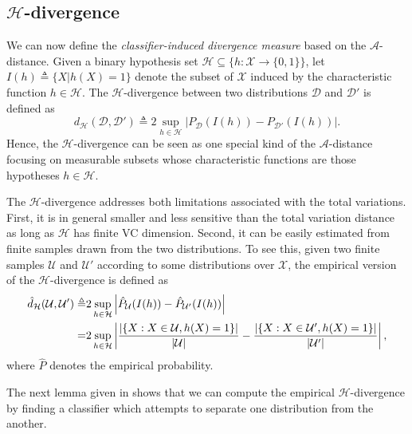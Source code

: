 \subsection{$\mathcal{H}$-divergence}
We can now define the \textit{classifier-induced divergence measure} based on the $\mathcal{A}$-distance. Given a binary hypothesis set $\mathcal{H} \subseteq \{h:\mathcal{X} \rightarrow \{0,1\}\}$, let $I(h) \triangleq \{ X \vert h(X)=1 \}$ denote the subset of $\mathcal{X}$ induced by the characteristic function $h \in \mathcal{H}$. The $\mathcal{H}$-divergence between two distributions $\mathcal{D}$ and $\mathcal{D}'$ is defined as
\begin{equation}\label{eq:h_divergence}
  d_{\mathcal{H}}(\mathcal{D}, \mathcal{D}') \triangleq 2\sup_{h \in \mathcal{H}} \vert P_{\mathcal{D}}(I(h))-P_{\mathcal{D}'}(I(h)) \vert.
\end{equation}
Hence, the $\mathcal{H}$-divergence can be seen as one special kind of the $\mathcal{A}$-distance focusing on measurable subsets whose characteristic functions are those hypotheses $h \in \mathcal{H}$.

The $\mathcal{H}$-divergence addresses both limitations associated with the total variations. First, it is in general smaller and less sensitive than the total variation distance as long as $\mathcal{H}$ has finite VC dimension. Second, it can be easily estimated from finite samples drawn from the two distributions. To see this, given two finite samples $\mathcal{U}$ and $\mathcal{U}'$ according to some distributions over $\mathcal{X}$, the empirical version of the $\mathcal{H}$-divergence is defined as
\begin{align}
  \hat{d}_{\mathcal{H}}(\mathcal{U}, \mathcal{U}')
  \triangleq & 2\sup_{h \in \mathcal{H}} \left \lvert \hat{P}_{\mathcal{U}}(I(h)) - \hat{P}_{\mathcal{U}'}(I(h)) \right \rvert \label{eq:emp_h_divergence_1}\\
  =& 2\sup_{h \in \mathcal{H}} \left \lvert \frac{\left \lvert \{X: X \in \mathcal{U}, h(X)=1\} \right \rvert}{\left \lvert \mathcal{U} \right \rvert}-\frac{\left \lvert \{X: X \in \mathcal{U'}, h(X)=1\} \right \rvert}{\left \lvert \mathcal{U}' \right \rvert} \right \rvert, \label{eq:emp_h_divergence_2}
\end{align}
where $\hat{P}$ denotes the empirical probability.

The next lemma given in \cite{BenDavid2010} shows that we can compute the empirical $\mathcal{H}$-divergence by finding a classifier which attempts to separate one distribution from the another.

